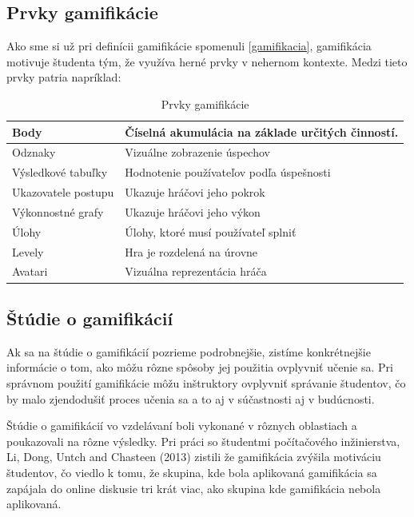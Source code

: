 \documentclass[10pt,oneside,slovak,a4paper]{article}
\begin{document}
\subsection{Prvky gamifikácie}
\label{elements}
Ako sme si už pri definícii gamifikácie spomenuli \ref{gamifikacia}, gamifikácia motivuje študenta tým, že využíva herné prvky v nehernom kontexte. Medzi tieto prvky patria napríklad:
\begin{table}[H]
\begin{tabular}{|l|l|}
\hline
Body                & Číselná akumulácia na základe určitých činností. \\ \hline
Odznaky             & Vizuálne zobrazenie úspechov                     \\ \hline
Výsledkové tabuľky  & Hodnotenie používateľov podľa úspešnosti         \\ \hline
Ukazovatele postupu & Ukazuje hráčovi jeho pokrok                      \\ \hline
Výkonnostné grafy   & Ukazuje hráčovi jeho výkon                       \\ \hline
Úlohy               & Úlohy, ktoré musí používateľ splniť              \\ \hline
Levely              & Hra je rozdelená na úrovne                       \\ \hline
Avatari             & Vizuálna reprezentácia hráča                     \\ \hline
\end{tabular} \caption{Prvky gamifikácie}
\end{table}


\subsection{Štúdie o gamifikácií} \label{studies}
Ak sa na štúdie o gamifikácií pozrieme podrobnejšie, zistíme konkrétnejšie informácie o tom, ako môžu rôzne spôsoby jej použitia ovplyvniť učenie sa. Pri správnom použití gamifikácie môžu inštruktory ovplyvniť správanie študentov, čo by malo zjendodušiť proces učenia sa a to aj v súčastnosti aj v budúcnosti.~\cite{garland2015gamification}

Štúdie o gamifikácií vo vzdelávaní boli vykonané v rôznych oblastiach a poukazovali na rôzne výsledky. Pri práci so študentmi počítačového inžinierstva, Li, Dong, Untch and Chasteen (2013) zistili že gamifikácia zvýšila motiváciu študentov, čo viedlo k tomu, že skupina, kde bola aplikovaná gamifikácia sa zapájala do online diskusie tri krát viac, ako skupina kde gamifikácia nebola aplikovaná.~\cite{li2013engaging}
\end{document}
